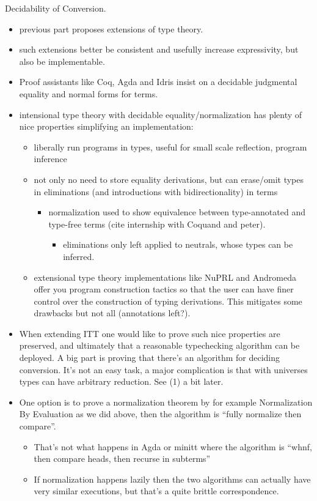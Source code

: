 \documentclass{book}
\begin{document}
Decidability of Conversion.
\begin{itemize}
 \item previous part proposes extensions of type theory.
 \item such extensions better be consistent and usefully increase expressivity, but also be implementable.
 \item Proof assistants like Coq, Agda and Idris insist on a decidable judgmental equality and normal forms for terms.
 \item intensional type theory with decidable equality/normalization has plenty of nice properties simplifying an implementation:
   \begin{itemize}
   \item liberally run programs in types, useful for small scale reflection, program inference
   \item not only no need to store equality derivations, but can erase/omit types in eliminations (and introductions with bidirectionality) in terms
     \begin{itemize}
     \item normalization used to show equivalence between type-annotated and type-free terms (cite internship with Coquand and peter).
         \begin{itemize}
         \item eliminations only left applied to neutrals, whose types can be inferred.
         \end{itemize}
     \end{itemize}

   \item extensional type theory implementations like NuPRL and Andromeda
   offer you program construction tactics so that the user can have finer control over the construction of typing derivations.
   This mitigates some drawbacks but not all (annotations left?).
   \end{itemize}

 \item When extending ITT one would like to prove such nice properties are
 preserved, and ultimately that a reasonable typechecking algorithm
 can be deployed. A big part is proving that there's an algorithm for
 deciding conversion. It's not an easy task, a major complication is that with universes types can have arbitrary reduction. See (1) a bit later.

 \item One option is to prove a normalization theorem by for example
   Normalization By Evaluation as we did above, then the algorithm is ``fully normalize then compare''.
   \begin{itemize}
   \item That's not what happens in Agda or minitt where the algorithm is ``whnf, then compare heads, then recurse in subterms''
   \item If normalization happens lazily then the two algorithms can actually have very similar executions, but that's a quite brittle correspondence.


\end{itemize}
\end{itemize}
\end{document}
